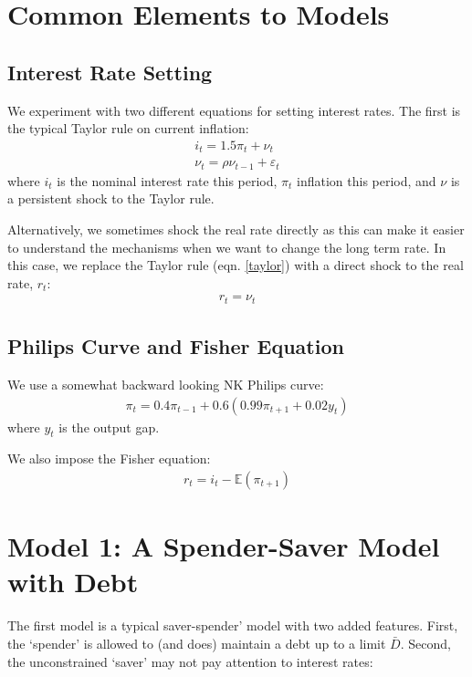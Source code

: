 \documentclass[AER]{AEA}
\begin{document}
	\section{Common Elements to Models}
	\subsection{Interest Rate Setting}
We experiment with two different equations for setting interest rates. The first is the typical Taylor rule on current inflation:
\begin{align}
	i_t = 1.5 \pi_t + \nu_t \label{taylor}\\
	\nu_t = \rho \nu_{t-1} + \varepsilon_t \nonumber
\end{align}
where $i_t$ is the nominal interest rate this period, $\pi_t$ inflation this period, and $\nu$ is a persistent shock to the Taylor rule.

Alternatively, we sometimes shock the real rate directly as this can make it easier to understand the mechanisms when we want to change the long term rate. In this case, we replace the Taylor rule (eqn. \ref{taylor}) with a direct shock to the real rate, $r_t$:
 \begin{align}
 	r_t = \nu_t \label{real_shock}
 \end{align}

\subsection{Philips Curve and Fisher Equation}
We use a somewhat backward looking NK Philips curve:
 \begin{align}
	\pi_t = 0.4 \pi_{t-1} + 0.6 (0.99 \pi_{t+1} + 0.02 y_t) \label{philips}
\end{align}
where $y_t$ is the output gap.

We also impose the Fisher equation:
 \begin{align}
	r_t = i_t - \mathbb{E}(\pi_{t+1}) \label{fisher}
\end{align}


\section{Model 1: A Spender-Saver Model with Debt}
The first model is a typical saver-spender' model with two added features. First, the `spender' is allowed to (and does) maintain a debt up to a limit $\bar{D}$. Second, the unconstrained `saver' may not pay attention to interest rates:
\end{document}
